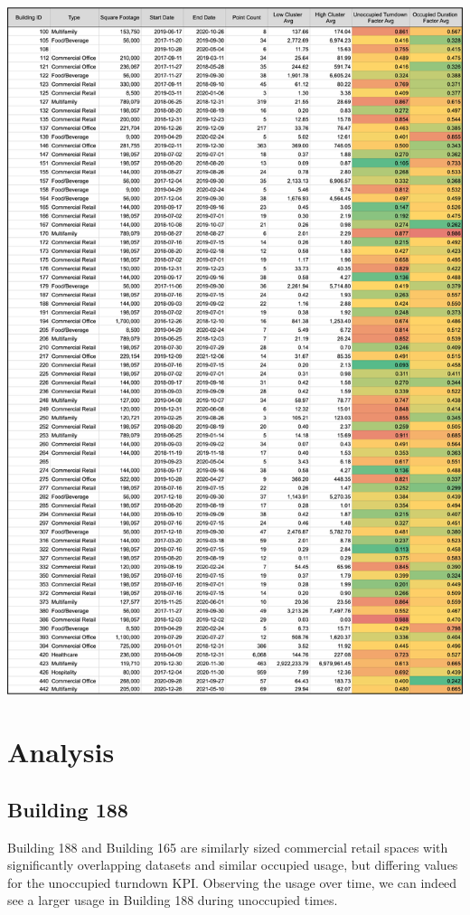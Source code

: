 \documentclass[a4paper]{article}
\begin{document}
\includegraphics[width=\columnwidth]{./images/KPI_Result_Table.png}

\section{Analysis}

\subsection{Building 188}

Building 188 and Building 165 are similarly sized commercial retail spaces with significantly overlapping datasets and similar occupied usage, but differing values for the unoccupied turndown KPI. Observing the usage over time, we can indeed see a larger usage in Building 188 during unoccupied times.
\end{document}
